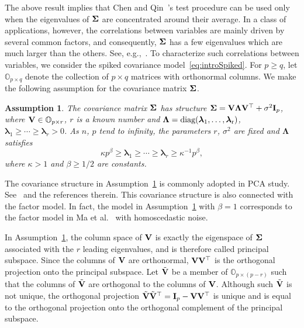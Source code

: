 \documentclass[times,sort&compress,3p]{elsarticle}
\newcommand{\mydiag}{\rm diag}
\newcommand{\bfsym}[1]{\ensuremath{\boldsymbol{#1}}}
\def\blambda {\bfsym {\lambda}}        \def\bLambda {\bfsym {\Lambda}}
\theoremstyle{plain}
\newtheorem{assumption}{\quad\quad Assumption}
\theoremstyle{definition}
\theoremstyle{remark}
\begin{document}
    The above result implies that Chen and Qin~\cite{Chen2010A}'s test procedure can be used only when the eigenvalues of $\bSigma$ are concentrated around their average. 
   In a class of applications, however, the correlations between variables are mainly driven by several common factors, and consequently, $\bSigma$ has a few eigenvalues which are much larger than the others.
    See, e.g.,~\cite{Cai2012Sparse,Fan2015Asymptotics,Jung2009PCA}.
To characterize such correlations between variables, we consider the  spiked covariance model~\eqref{eq:introSpiked}.
For $p\geq q$, let $\mathbb{O}_{p\times q}$ denote the collection of $p\times q$ matrices with orthonormal columns.
We make the following assumption for the covariance matrix $\bSigma$.
\begin{assumption}\label{theModel}
    The covariance matrix $\bSigma$ has structure $ \bSigma=\BV\bLambda \BV^\top +\sigma^2 \BI_p$, where $\mathbf{V}\in\mathbb{O}_{p\times r}$, $r$ is a known number and $\bLambda=\mydiag(\blambda_{1},\ldots,\blambda_{r})$, 
 $\blambda_{1}\geq \cdots \geq \blambda_{r}>0$.
As $n$, $p$ tend to infinity, the parameters
$r$, $\sigma^2$ are fixed and $\bLambda$ satisfies     
    \begin{equation*}
        \kappa p^{\beta}\geq \blambda_{1}\geq \cdots \geq\blambda_{r}\geq \kappa^{-1}p^{\beta},
\end{equation*}
where $\kappa>1$ and $\beta\geq {1}/{2}$ are constants.
\end{assumption}

The covariance structure in Assumption~\ref{theModel} is commonly adopted in PCA study.
See~\cite{Birnbaum2013,Cai2012Sparse,Passemier2015} and the references therein.
This covariance structure is also connected with the factor model.
In fact, the model in Assumption~\ref{theModel} with $\beta=1$
corresponds to the factor model in Ma {\rm et al.}~\cite{Ma2015A} with homoscedastic noise.

In Assumption~\ref{theModel}, the column space of $\mathbf{V}$ is exactly the eigenspace of $\bSigma$ associated with the $r$ leading eigenvalues, and is therefore called principal subspace. Since the columns of $\mathbf{V}$ are orthonormal, $\mathbf{V} \mathbf{V}^\top $ is the orthogonal projection onto the principal subspace.
Let $\tilde{\mathbf{V}}$ be a member of $\mathbb{O}_{p\times (p-r)}$ such that the columns of $\tilde{\mathbf{V}}$ are orthogonal to the columns of  $\mathbf{V}$.
 Although such $\tilde{\mathbf{V}}$ is not unique, the orthogonal projection  $\tilde{\mathbf{V}}\tilde{\mathbf{V}}^\top =\mathbf{I}_p-\mathbf{V} \mathbf{V}^\top $ is unique and is equal to the orthogonal projection onto the orthogonal complement of the principal subspace.
\end{document}

